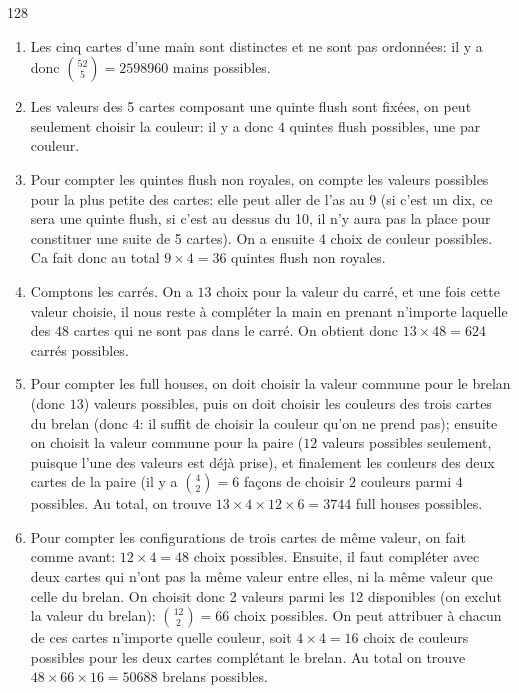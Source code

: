 \begin{Soln}{128}
\begin{enumerate}
\item Les cinq cartes d'une main sont distinctes et ne sont pas ordonnées: il y a donc $\binom{52}{5}=2598960$ mains possibles.

\item Les valeurs des 5 cartes composant une quinte flush sont fixées, on peut seulement choisir la couleur: il y a donc $4$ quintes flush possibles, une par couleur.

\item Pour compter les quintes flush non royales, on compte les valeurs possibles pour la plus petite des cartes: elle peut aller de l'as au 9 (si c'est un dix, ce sera une quinte flush, si c'est au dessus du 10, il n'y aura pas la place pour constituer une suite de 5 cartes). On a ensuite 4 choix de couleur possibles. Ca fait donc au total $9 \times 4=36$ quintes flush non royales.

\item Comptons les carrés. On a $13$ choix pour la valeur du carré, et une fois cette valeur choisie, il nous reste à compléter la main en prenant n'importe laquelle des $48$ cartes qui ne sont pas dans le carré. On obtient donc $13\times 48=624$ carrés possibles.

\item Pour compter les full houses, on doit choisir la valeur commune pour le brelan (donc $13$) valeurs possibles, puis on doit choisir les couleurs des trois cartes du brelan (donc $4$: il suffit de choisir la couleur qu'on ne prend pas); ensuite on choisit la valeur commune pour la paire ($12$ valeurs possibles seulement, puisque l'une des valeurs est déjà prise), et finalement les couleurs des deux cartes de la paire (il y a ${4 \choose 2}=6$ façons de choisir $2$ couleurs parmi $4$ possibles. Au total, on trouve $13\times4\times 12 \times 6=3744$ full houses possibles.

\item Pour compter les configurations de trois cartes de même valeur, on fait comme avant: $12\times 4=48$ choix possibles. Ensuite, il faut compléter avec deux cartes qui n'ont pas la même valeur entre elles, ni la même valeur que celle du brelan. On choisit donc 2 valeurs parmi les 12 disponibles (on exclut la valeur du brelan): ${12 \choose 2}=66$ choix possibles. On peut attribuer à chacun de ces cartes n'importe quelle couleur, soit $4\times 4=16$ choix de couleurs possibles pour les deux cartes complétant le brelan. Au total on trouve $48 \times 66 \times 16=50688$ brelans possibles.
\end{enumerate}
\end{Soln}
